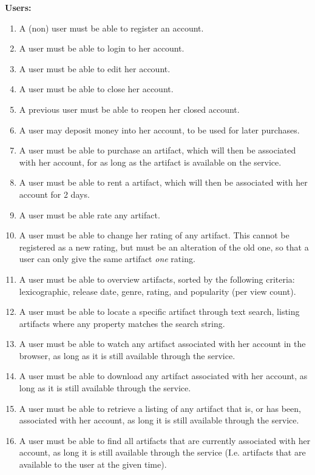 \textbf{Users:}
\begin{enumerate}
\setcounter{enumi}{\theenumTemp}
\item A (non) user must be able to register an account.
\item A user must be able to login to her account.
\item A user must be able to edit her account.
\item A user must be able to close her account.
\item A previous user must be able to reopen her closed account.
\item A user may deposit money into her account, to be used for later
	purchases.
\item A user must be able to purchase an artifact, which will then be associated
	with her account, for as long as the artifact is available on the
	service.
\item A user must be able to rent a artifact, which will then be associated
	with her account for 2 days.
\item A user must be able rate any artifact.
\item A user must be able to change her rating of any artifact.
	This cannot be registered as a new rating, but must be an alteration of
	the old one, so that a user can only give the same artifact \emph{one}
	rating.
\item A user must be able to overview artifacts, sorted by the following
	criteria: lexicographic, release date, genre, rating, and
	popularity (per view count).
\item A user must be able to locate a specific artifact through text search,
	listing artifacts where any property matches the search string.
\item A user must be able to watch any artifact associated with her account
	in the browser, as long as it is still available through the service.
\item A user must be able to download any artifact associated with her account,
	as long as it is still available through the service.
\item A user must be able to retrieve a listing of any artifact that is, or has
	been, associated with her account, as long it is still available through
	the service.
\item A user must be able to find all artifacts that are currently associated
	with her account, as long it is still available through the service (I.e.
	artifacts that are available to the user at the given time).
\setcounter{enumTemp}{\theenumi}
\end{enumerate}
